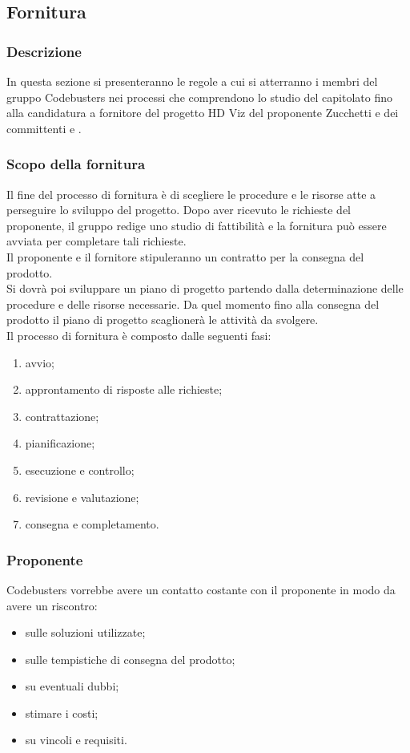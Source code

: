 \subsection{Fornitura}
\subsubsection{Descrizione}
In questa sezione si presenteranno le regole a cui si atterranno i membri del gruppo Codebusters nei processi che comprendono lo studio del capitolato fino alla candidatura a fornitore del progetto HD Viz del proponente Zucchetti e dei committenti \VT e \CR .  
\subsubsection{Scopo della fornitura}
Il fine del processo di fornitura è di scegliere le procedure e le risorse atte a perseguire lo sviluppo del progetto. Dopo aver ricevuto le richieste del proponente, il gruppo redige uno studio di fattibilità e la fornitura può essere avviata per completare tali richieste.\\
Il proponente e il fornitore stipuleranno un contratto per la consegna del prodotto.\\
Si dovrà poi sviluppare un piano di progetto partendo dalla determinazione delle procedure e delle risorse necessarie.
Da quel momento fino alla consegna del prodotto il piano di progetto scaglionerà le attività da svolgere. \\
 Il processo di fornitura è composto dalle seguenti fasi:
 \begin{enumerate}
 \item avvio; 
\item approntamento di risposte alle richieste;
\item contrattazione;
\item pianificazione;
\item esecuzione e controllo;
\item revisione e valutazione;
\item consegna e completamento.
 \end{enumerate}
\subsubsection{Proponente}
Codebusters vorrebbe avere un contatto costante con il proponente in modo da avere un riscontro:
\begin{itemize}
\item sulle soluzioni utilizzate;
\item sulle tempistiche di consegna del prodotto;
\item su eventuali dubbi;
\item stimare i costi;
\item su vincoli e requisiti.
\end{itemize}
